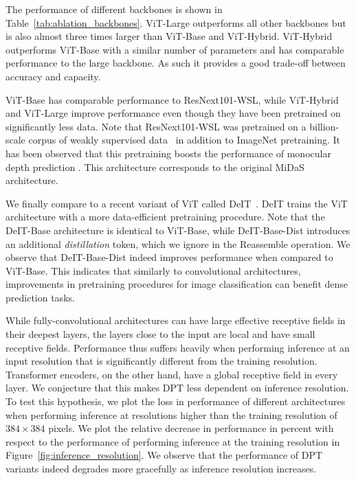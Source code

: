\documentclass[10pt,twocolumn,letterpaper]{article}
\begin{document}
 The performance of different backbones is shown in
Table~\ref{tab:ablation_backbones}. ViT-Large outperforms all other backbones
but is also almost three times larger than ViT-Base and ViT-Hybrid. ViT-Hybrid
outperforms ViT-Base with a similar number of parameters
and has comparable performance to the large backbone. As such it
provides a good trade-off between accuracy and capacity.


ViT-Base has comparable performance to ResNext101-WSL, while ViT-Hybrid and
ViT-Large improve performance even though they have been pretrained on
significantly less data. Note that ResNext101-WSL was pretrained on a
billion-scale corpus of weakly supervised data~\cite{Mahajan2018} in addition to
ImageNet pretraining. It has been observed that this pretraining boosts the
performance of monocular depth prediction \cite{Ranftl2020}. This
architecture corresponds to the original MiDaS architecture.

We finally compare to a recent variant of ViT called
DeIT~\cite{touvron2020deit}. DeIT trains the ViT architecture with a more
data-efficient pretraining procedure. Note that the DeIT-Base architecture is
identical to ViT-Base, while DeIT-Base-Dist introduces an additional
\textit{distillation} token, which we ignore in the Reassemble operation. We observe
that DeIT-Base-Dist indeed improves performance when compared to ViT-Base. This
indicates that similarly to convolutional architectures, improvements in
pretraining procedures for image classification can benefit dense prediction
tasks.

 While fully-convolutional architectures can have
large effective receptive fields in their deepest layers, the layers close to
the input are local and have small receptive fields. Performance thus suffers
heavily when performing inference at an input resolution that is significantly
different from the training resolution. Transformer encoders, on the other hand,
have a global receptive field in every layer. We conjecture that this makes DPT
less dependent on inference resolution. To test this hypothesis, we plot the
loss in performance of different architectures when performing inference at
resolutions higher than the training resolution of $384 \times 384$ pixels. We
plot the relative decrease in performance in percent with respect to the
performance of performing inference at the training resolution in
Figure~\ref{fig:inference_resolution}. We observe that the performance of DPT variants indeed degrades more gracefully as inference resolution increases.
\end{document}
